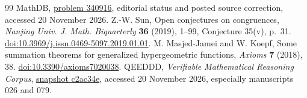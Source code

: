 \documentclass[11pt,a4paper]{article}
\begin{document}
\begin{thebibliography}{99}
 MathDB, \href{https://mathdb.com/p/340916/cigler-s-odd-index-hankel-determinant-formulas-for-catalan-c}{problem 340916}, editorial status and posted source correction, accessed 20 November 2026.
 Z.-W. Sun, Open conjectures on congruences, \emph{Nanjing Univ. J. Math. Biquarterly} \textbf{36} (2019), 1--99, Conjecture 35(v), p.~31. \href{https://doi.org/10.3969/j.issn.0469-5097.2019.01.01}{doi:10.3969/j.issn.0469-5097.2019.01.01}.
 M. Masjed-Jamei and W. Koepf, Some summation theorems for generalized hypergeometric functions, \emph{Axioms} \textbf{7} (2018), 38. \href{https://doi.org/10.3390/axioms7020038}{doi:10.3390/axioms7020038}.
 QEEDDD, \emph{Verifiable Mathematical Reasoning Corpus}, \href{https://github.com/QEEDDD/Verifiable-Mathematical-Reasoning-Corpus/tree/c2ac34ea4622778187173f41bb1996deee8081b7}{snapshot c2ac34e}, accessed 20 November 2026, especially manuscripts 026 and 079.
\end{thebibliography}
\end{document}
